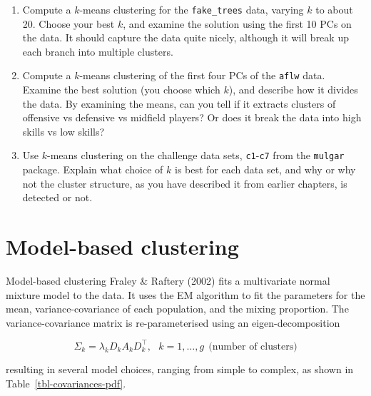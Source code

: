 \documentclass[
  letterpaper,
]{krantz}
\providecommand{\tightlist}{%
  \setlength{\itemsep}{0pt}\setlength{\parskip}{0pt}}\usepackage{longtable,booktabs,array}
\begin{document}
\begin{enumerate}
\def\labelenumi{\arabic{enumi}.}
\tightlist
\item
  Compute a \(k\)-means clustering for the \texttt{fake\_trees} data,
  varying \(k\) to about 20. Choose your best \(k\), and examine the
  solution using the first 10 PCs on the data. It should capture the
  data quite nicely, although it will break up each branch into multiple
  clusters.
\item
  Compute a \(k\)-means clustering of the first four PCs of the
  \texttt{aflw} data. Examine the best solution (you choose which
  \(k\)), and describe how it divides the data. By examining the means,
  can you tell if it extracts clusters of offensive vs defensive vs
  midfield players? Or does it break the data into high skills vs low
  skills?
\item
  Use \(k\)-means clustering on the challenge data sets,
  \texttt{c1}-\texttt{c7} from the \texttt{mulgar} package. Explain what
  choice of \(k\) is best for each data set, and why or why not the
  cluster structure, as you have described it from earlier chapters, is
  detected or not.
\end{enumerate}


\chapter{Model-based clustering}\label{sec-mclust}


Model-based clustering Fraley \& Raftery (2002) fits a multivariate
normal mixture model to the data. It uses the EM algorithm to fit the
parameters for the mean, variance-covariance of each population, and the
mixing proportion. The variance-covariance matrix is re-parameterised
using an eigen-decomposition

\[
\Sigma_k = \lambda_kD_kA_kD_k^\top, ~~~k=1, \dots, g ~~\mbox{(number of clusters)}
\]

\noindent resulting in several model choices, ranging from simple to
complex, as shown in Table~\ref{tbl-covariances-pdf}.
\end{document}
